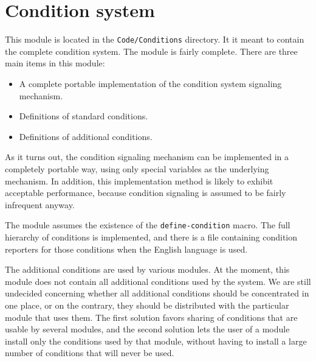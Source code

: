 \chapter{Condition system}

This module is located in the \texttt{Code/Conditions} directory.  It
it meant to contain the complete \commonlisp{} condition system.  The module
is fairly complete.  There are three main items in this module:

\begin{itemize}
\item A complete portable implementation of the \commonlisp{} condition
  system signaling mechanism.
\item Definitions of standard \commonlisp{} conditions.
\item Definitions of additional \sysname{} conditions.
\end{itemize}

As it turns out, the \commonlisp{} condition signaling mechanism can be
implemented in a completely portable way, using only special variables
as the underlying mechanism.  In addition, this implementation method
is likely to exhibit acceptable performance, because condition
signaling is assumed to be fairly infrequent anyway.  

The module assumes the existence of the \texttt{define-condition}
macro.  The full hierarchy of \commonlisp{} conditions is implemented, and
there is a file containing condition reporters for those conditions
when the English language is used.

The additional conditions are used by various \sysname{} modules.
At the moment, this module does not contain all additional conditions
used by the system.  We are still undecided concerning whether all
additional conditions should be concentrated in one place, or on the
contrary, they should be distributed with the particular module that
uses them.  The first solution favors sharing of conditions that are
usable by several modules, and the second solution lets the user of a
module install only the conditions used by that module, without having
to install a large number of conditions that will never be used.

